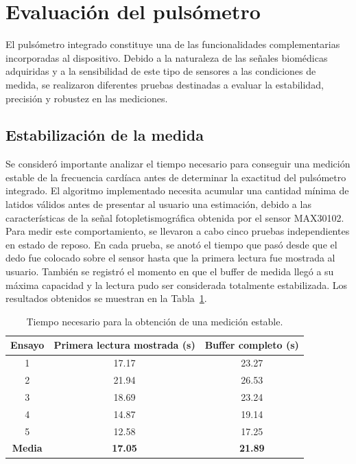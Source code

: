 \section{Evaluación del pulsómetro}

El pulsómetro integrado constituye una de las funcionalidades complementarias incorporadas al dispositivo. Debido a la naturaleza de las señales biomédicas adquiridas y a la sensibilidad de este tipo de sensores a las condiciones de medida, se realizaron diferentes pruebas destinadas a evaluar la estabilidad, precisión y robustez en las mediciones.\\

\subsection{Estabilización de la medida}

Se consideró importante analizar el tiempo necesario para conseguir una medición estable de la frecuencia cardíaca antes de determinar la exactitud del pulsómetro integrado. El algoritmo implementado necesita acumular una cantidad mínima de latidos válidos antes de presentar al usuario una estimación, debido a las características de la señal fotopletismográfica obtenida por el sensor MAX30102.\\

Para medir este comportamiento, se llevaron a cabo cinco pruebas independientes en estado de reposo. En cada prueba, se anotó el tiempo que pasó desde que el dedo fue colocado sobre el sensor hasta que la primera lectura fue mostrada al usuario. También se registró el momento en que el buffer de medida llegó a su máxima capacidad y la lectura pudo ser considerada totalmente estabilizada. Los resultados obtenidos se muestran en la Tabla~\ref{tab:estabilizacion_pulso}.\\

\begin{table}[H]
\centering
\caption{Tiempo necesario para la obtención de una medición estable.}
\label{tab:estabilizacion_pulso}
\begin{tabular}{|c|c|c|}
\hline
\textbf{Ensayo} & \textbf{Primera lectura mostrada (s)} & \textbf{Buffer completo (s)} \\ \hline
1 & 17.17 & 23.27 \\ \hline
2 & 21.94 & 26.53 \\ \hline
3 & 18.69 & 23.24 \\ \hline
4 & 14.87 & 19.14 \\ \hline
5 & 12.58 & 17.25 \\ \hline
\textbf{Media} & \textbf{17.05} & \textbf{21.89} \\ \hline
\end{tabular}
\end{table}

